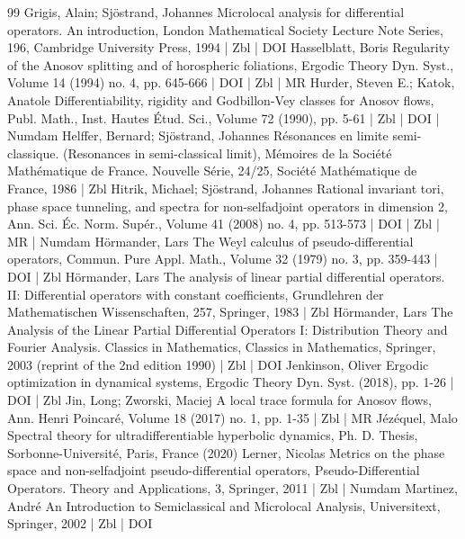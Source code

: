 \documentclass[10pt]{amsart}
\theoremstyle{definition}\newtheorem{defi}[theo]{Definition}\newtheorem{rema}[theo]{Remark}\newtheorem{exam}[theo]{Example}\newtheorem{exem}[theo]{Example}\newtheorem{nota}[theo]{Notation}
\begin{document}
\begin{thebibliography}{99}
Grigis, Alain; Sjöstrand, Johannes Microlocal analysis for differential operators. An introduction, London Mathematical Society Lecture Note Series, 196, Cambridge University Press, 1994 | Zbl | DOI
Hasselblatt, Boris Regularity of the Anosov splitting and of horospheric foliations, Ergodic Theory Dyn. Syst., Volume 14 (1994) no. 4, pp. 645-666 | DOI | Zbl | MR
Hurder, Steven E.; Katok, Anatole Differentiability, rigidity and Godbillon-Vey classes for Anosov flows, Publ. Math., Inst. Hautes Étud. Sci., Volume 72 (1990), pp. 5-61 | Zbl | DOI | Numdam
Helffer, Bernard; Sjöstrand, Johannes Résonances en limite semi-classique. (Resonances in semi-classical limit), Mémoires de la Société Mathématique de France. Nouvelle Série, 24/25, Société Mathématique de France, 1986 | Zbl
Hitrik, Michael; Sjöstrand, Johannes Rational invariant tori, phase space tunneling, and spectra for non-selfadjoint operators in dimension 2, Ann. Sci. Éc. Norm. Supér., Volume 41 (2008) no. 4, pp. 513-573 | DOI | Zbl | MR | Numdam
Hörmander, Lars The Weyl calculus of pseudo-differential operators, Commun. Pure Appl. Math., Volume 32 (1979) no. 3, pp. 359-443 | DOI | Zbl
Hörmander, Lars The analysis of linear partial differential operators. II: Differential operators with constant coefficients, Grundlehren der Mathematischen Wissenschaften, 257, Springer, 1983 | Zbl
Hörmander, Lars The Analysis of the Linear Partial Differential Operators I: Distribution Theory and Fourier Analysis. Classics in Mathematics, Classics in Mathematics, Springer, 2003 (reprint of the 2nd edition 1990) | Zbl | DOI
Jenkinson, Oliver Ergodic optimization in dynamical systems, Ergodic Theory Dyn. Syst. (2018), pp. 1-26 | DOI | Zbl
Jin, Long; Zworski, Maciej A local trace formula for Anosov flows, Ann. Henri Poincaré, Volume 18 (2017) no. 1, pp. 1-35 | Zbl | MR
Jézéquel, Malo Spectral theory for ultradifferentiable hyperbolic dynamics, Ph. D. Thesis, Sorbonne-Université, Paris, France (2020)
Lerner, Nicolas Metrics on the phase space and non-selfadjoint pseudo-differential operators, Pseudo-Differential Operators. Theory and Applications, 3, Springer, 2011 | Zbl | Numdam
Martinez, André An Introduction to Semiclassical and Microlocal Analysis, Universitext, Springer, 2002 | Zbl | DOI

\end{thebibliography}
\end{document}
